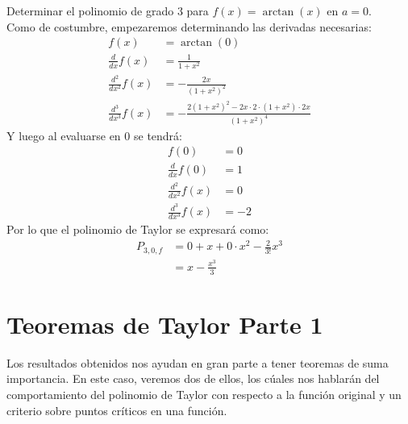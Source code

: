 \documentclass[12pt,a4paper,oneside]{memoir}
\begin{document}
\begin{problem}
    Determinar el polinomio de grado $3$ para $f(x) = \arctan(x)$ en $a=0$.\\

    Como de costumbre, empezaremos determinando las derivadas necesarias:
    \begin{align*}
        f(x) &= \arctan(0)\\
        \frac{d}{dx} f(x) &= \frac{1}{1+x^2}\\
        \frac{d^2}{dx^2} f(x) &= -\frac{2x}{(1+x^2)^2}\\
        \frac{d^3}{dx^3} f(x) &= -\frac{2(1+x^2)^2 - 2x \cdot 2 \cdot (1+x^2) \cdot 2x}{(1+x^2)^4}
    \end{align*}
    Y luego al evaluarse en $0$ se tendrá:
    \begin{align*}
        f(0) &= 0\\
        \frac{d}{dx} f(0) &= 1\\
        \frac{d^2}{dx^2} f(x) &= 0\\
        \frac{d^3}{dx^3} f(x) &= -2
    \end{align*}
    Por lo que el polinomio de Taylor se expresará como:
    \begin{align*}
        P_{3, 0, f} &= 0 + x + 0 \cdot x^2 - \frac{2}{3!} x^3\\
        &= x - \frac{x^3}{3} 
    \end{align*}
\end{problem}

\section*{Teoremas de Taylor Parte 1}
Los resultados obtenidos nos ayudan en gran parte a tener teoremas de suma importancia. En este caso, veremos dos de ellos, los cúales nos hablarán del comportamiento del polinomio de Taylor con respecto a la función original y un criterio sobre puntos críticos en una función.
\end{document}
